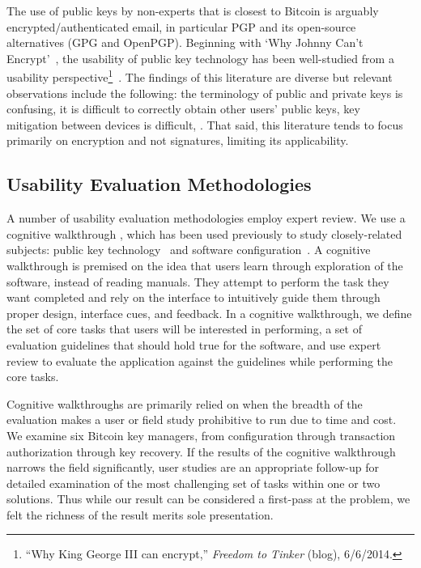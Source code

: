 The use of public keys by non-experts that is closest to Bitcoin is arguably encrypted/authenticated email, in particular PGP and its open-source alternatives (\ie GPG and OpenPGP). Beginning with `Why Johnny Can't Encrypt'~\cite{WT99}, the usability of public key technology has been well-studied from a usability perspective\footnote{``Why King George III can encrypt,'' \textit{Freedom to Tinker} (blog), 6/6/2014.}~\cite{GM05,GMSN+05,SBKH06,GFF06}. The findings of this literature are diverse but relevant observations include the following: the terminology of public and private keys is confusing, it is difficult to correctly obtain other users' public keys, key mitigation between devices is difficult, \etc. That said, this literature tends to focus primarily on encryption and not signatures, limiting its applicability.

\subsection{Usability Evaluation Methodologies}

A number of usability evaluation methodologies employ expert review. We use a cognitive walkthrough \cite{WRLP94}, which has been used previously to study closely-related subjects: public key technology~\cite{WT99} and software configuration~\cite{COA07}. A cognitive walkthrough is premised on the idea that users learn through exploration of the software, instead of reading manuals. They attempt to perform the task they want completed and rely on the interface to intuitively guide them through proper design, interface cues, and feedback. In a cognitive walkthrough, we define the set of core tasks that users will be interested in performing, a set of evaluation guidelines that should hold true for the software, and use expert review to evaluate the application against the guidelines while performing the core tasks. 

Cognitive walkthroughs are primarily relied on when the breadth of the evaluation makes a user or field study prohibitive to run due to time and cost. We examine six Bitcoin key managers, from configuration through transaction authorization through key recovery. If the results of the cognitive walkthrough narrows the field significantly, user studies are an appropriate follow-up for detailed examination of the most challenging set of tasks within one or two solutions. Thus while our result can be considered a first-pass at the problem, we felt the richness of the result merits sole presentation.

